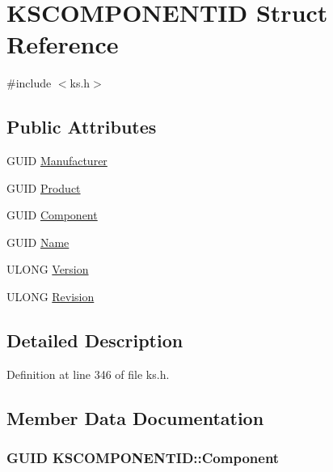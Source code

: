 \hypertarget{struct_k_s_c_o_m_p_o_n_e_n_t_i_d}{}\section{K\+S\+C\+O\+M\+P\+O\+N\+E\+N\+T\+ID Struct Reference}
\label{struct_k_s_c_o_m_p_o_n_e_n_t_i_d}


{\ttfamily \#include $<$ks.\+h$>$}

\subsection*{Public Attributes}
\begin{DoxyCompactItemize}
\item 
G\+U\+ID \hyperlink{struct_k_s_c_o_m_p_o_n_e_n_t_i_d_a59a872f7cd6f61dfcacf8e31727fab51}{Manufacturer}
\item 
G\+U\+ID \hyperlink{struct_k_s_c_o_m_p_o_n_e_n_t_i_d_a253cb1a45b797697c3ceb0cba32caed5}{Product}
\item 
G\+U\+ID \hyperlink{struct_k_s_c_o_m_p_o_n_e_n_t_i_d_a0b70af11c8775107a245cff47de4c3e1}{Component}
\item 
G\+U\+ID \hyperlink{struct_k_s_c_o_m_p_o_n_e_n_t_i_d_a39abe357adffa248232be0dc90a474ab}{Name}
\item 
U\+L\+O\+NG \hyperlink{struct_k_s_c_o_m_p_o_n_e_n_t_i_d_aaf6b16bb74b0789b8c332dcefcac6885}{Version}
\item 
U\+L\+O\+NG \hyperlink{struct_k_s_c_o_m_p_o_n_e_n_t_i_d_a75509b7781b2ad620ce927112a26970d}{Revision}
\end{DoxyCompactItemize}


\subsection{Detailed Description}


Definition at line 346 of file ks.\+h.



\subsection{Member Data Documentation}
\subsubsection[{\texorpdfstring{Component}{Component}}]{\setlength{\rightskip}{0pt plus 5cm}G\+U\+ID K\+S\+C\+O\+M\+P\+O\+N\+E\+N\+T\+I\+D\+::\+Component}\hypertarget{struct_k_s_c_o_m_p_o_n_e_n_t_i_d_a0b70af11c8775107a245cff47de4c3e1}{}\label{struct_k_s_c_o_m_p_o_n_e_n_t_i_d_a0b70af11c8775107a245cff47de4c3e1}


